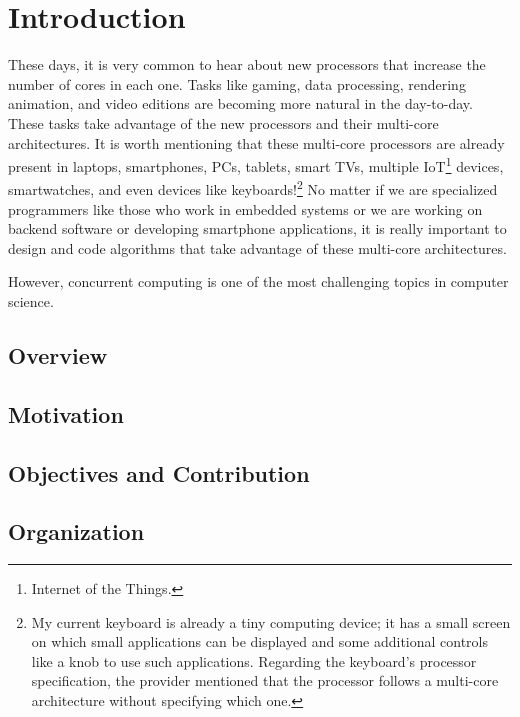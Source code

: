 \chapter{\label{chapter:1_Introduction}Introduction}

These days, it is very common to hear about new processors that increase the number of cores in each one. Tasks like gaming, data processing, rendering animation, and video editions are becoming more natural in the day-to-day. These tasks take advantage of the new processors and their multi-core architectures. It is worth mentioning that these multi-core processors are already present in laptops, smartphones, PCs, tablets, smart TVs, multiple IoT\footnote{Internet of the Things.} devices, smartwatches, and even devices like keyboards!\footnote{My current keyboard is already a tiny computing device; it has a small screen on which small applications can be displayed and some additional controls like a knob to use such applications. Regarding the keyboard's processor specification, the provider mentioned that the processor follows a multi-core architecture without specifying which one.} No matter if we are specialized programmers like those who work in embedded systems or we are working on backend software or developing smartphone applications, it is really important to design and code algorithms that take advantage of these multi-core architectures.

However, concurrent computing is one of the most challenging topics in computer science.

\section{\label{section:Overview}Overview}
\section{\label{section:Motivation}Motivation}
\section{\label{section:Objectives}Objectives and Contribution}
\section{\label{section:Organization}Organization}
